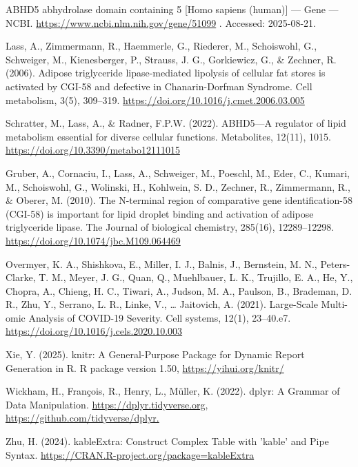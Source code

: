 \documentclass{article}
\begin{document}

\clearpage
\begin{thebibliography}{9}

ABHD5 abhydrolase domain containing 5 [Homo sapiens (human)] — Gene — NCBI.
\url{https://www.ncbi.nlm.nih.gov/gene/51099} . Accessed: 2025-08-21.

Lass, A., Zimmermann, R., Haemmerle, G., Riederer, M., Schoiswohl, G., Schweiger, M., Kienesberger, P., Strauss, J. G., Gorkiewicz, G., \& Zechner, R. (2006). Adipose triglyceride lipase-mediated lipolysis of cellular fat stores is activated by CGI-58 and defective in Chanarin-Dorfman Syndrome. Cell metabolism, 3(5), 309–319. \url{https://doi.org/10.1016/j.cmet.2006.03.005}

Schratter, M., Lass, A., \& Radner, F.P.W. (2022).
ABHD5—A regulator of lipid metabolism essential for diverse cellular functions.
Metabolites, 12(11), 1015. \url{https://doi.org/10.3390/metabo12111015}

Gruber, A., Cornaciu, I., Lass, A., Schweiger, M., Poeschl, M., Eder, C., Kumari, M., Schoiswohl, G., Wolinski, H., Kohlwein, S. D., Zechner, R., Zimmermann, R., \& Oberer, M. (2010). The N-terminal region of comparative gene identification-58 (CGI-58) is important for lipid droplet binding and activation of adipose triglyceride lipase. The Journal of biological chemistry, 285(16), 12289–12298. 
\url{https://doi.org/10.1074/jbc.M109.064469}

Overmyer, K. A., Shishkova, E., Miller, I. J., Balnis, J., Bernstein, M. N., Peters-Clarke, T. M., Meyer, J. G., Quan, Q., Muehlbauer, L. K., Trujillo, E. A., He, Y., Chopra, A., Chieng, H. C., Tiwari, A., Judson, M. A., Paulson, B., Brademan, D. R., Zhu, Y., Serrano, L. R., Linke, V., … Jaitovich, A. (2021). Large-Scale Multi-omic Analysis of COVID-19 Severity. Cell systems, 12(1), 23–40.e7. 
\url{https://doi.org/10.1016/j.cels.2020.10.003}

Xie, Y. (2025). knitr: A General-Purpose Package for Dynamic Report Generation in R. R package version 1.50, \url{https://yihui.org/knitr/}

Wickham, H., François, R., Henry, L., Müller, K. (2022). dplyr: A Grammar of Data Manipulation. \url{https://dplyr.tidyverse.org, https://github.com/tidyverse/dplyr.}

Zhu, H. (2024). kableExtra: Construct Complex Table with 'kable' and Pipe Syntax. 
\url {https://CRAN.R-project.org/package=kableExtra}


\end{thebibliography}
\end{document}

